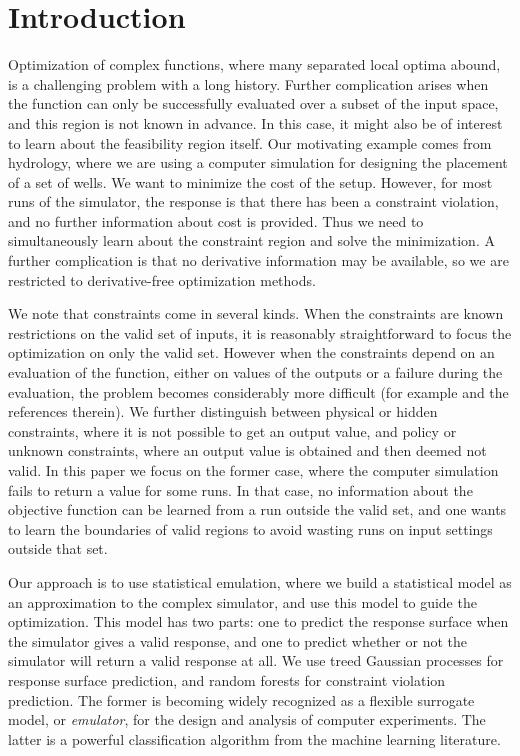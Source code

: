 \documentclass[12pt]{article}
\begin{document}
\section{Introduction}

Optimization of complex functions, where many separated local optima
abound, is a challenging problem with a long history.  Further
complication arises when the function can only be successfully
evaluated over a subset of the input space, and this region is not
known in advance. In this case, it might also be of interest to learn
about the feasibility region itself.  Our motivating example comes
from hydrology, where we are using a computer simulation for designing
the placement of a set of wells. We want to minimize the cost of the
setup.  However, for most runs of the simulator, the response is that
there has been a constraint violation, and no further information
about cost is provided.  Thus we need to simultaneously learn about
the constraint region and solve the minimization.  A further
complication is that no derivative information may be available, so we
are restricted to derivative-free optimization methods.

We note that constraints come in several kinds.  When the constraints
are known restrictions on the valid set of inputs, it is reasonably
straightforward to focus the optimization on only the valid set.
However when the constraints depend on an evaluation of the function,
either on values of the outputs or a failure during the evaluation, the problem
becomes considerably more difficult (for example \cite{fink:kell:2009}
and the references therein).  We further distinguish between
physical or hidden constraints, where it is not possible to get an
output value, and policy or unknown constraints, where an output value is
obtained and then deemed not valid.  In this paper we focus on the
former case, where the computer simulation fails to return a value for
some runs.  In that case, no information about the objective function
can be learned from a run outside the valid set, and one wants to
learn the boundaries of valid regions to avoid wasting runs on input
settings outside that set.

Our approach is to use statistical emulation, where we build a
statistical model as an approximation to the complex simulator, and
use this model to guide the optimization.  This model has two parts:
one to predict the response surface when the simulator gives a valid
response, and one to predict whether or not the simulator will return
a valid response at all.  We use treed Gaussian processes
\cite{gra:lee:2008} for response surface prediction, and random
forests \cite{brei:2001} for constraint violation prediction.  The
former is becoming widely recognized as a flexible surrogate model, or
{\em emulator}, for the design and analysis of computer experiments.
The latter is a powerful classification algorithm from the machine
learning literature.
\end{document}
